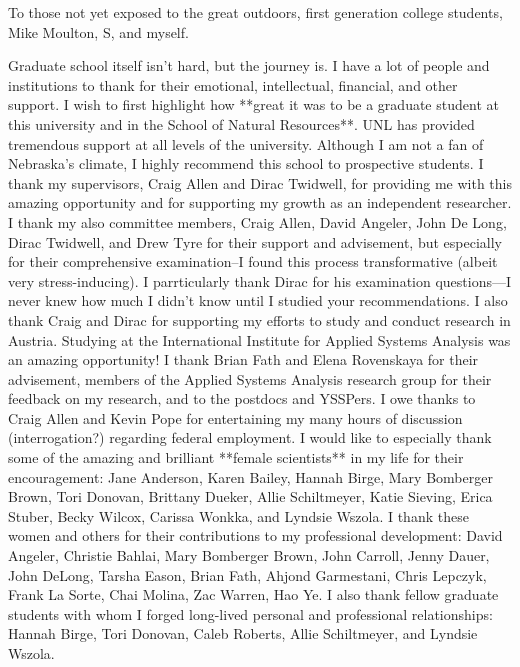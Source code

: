 \documentclass[print]{nuthesis}
\begin{document}

 \begin{dedication}
To those not yet exposed to the great outdoors, first generation college students, Mike Moulton, S, and myself.
 \end{dedication}

 \begin{acknowledgments}
Graduate school itself isn't hard, but the journey is. I have a lot of people and institutions to thank for their emotional, intellectual, financial, and other support. I wish to first highlight how **great it was to be a graduate student at this university and in the School of Natural Resources**. UNL has provided tremendous support at all levels of the university. Although I am not a fan of Nebraska's climate, I highly recommend this school to prospective students. 
I thank my supervisors, Craig Allen and Dirac Twidwell, for providing me with this amazing opportunity and for supporting my growth as an independent researcher. I thank my also committee members, Craig Allen, David Angeler, John De Long, Dirac Twidwell, and Drew Tyre for their support and advisement, but especially for their comprehensive examination--I found this process transformative (albeit very stress-inducing). I  parrticularly thank Dirac for his examination questions---I never knew how much I didn't know until I studied your recommendations. I also thank Craig and Dirac for supporting my efforts to study and conduct research in Austria. 
Studying at the International Institute for Applied Systems Analysis was an amazing opportunity! I thank Brian Fath and Elena Rovenskaya for their advisement, members of the Applied Systems Analysis research group for their feedback on my research, and to the postdocs and YSSPers. I owe thanks to Craig Allen and Kevin Pope for entertaining my many hours of discussion (interrogation?) regarding federal employment. 
I would like to especially thank some of the amazing and brilliant **female scientists** in my life for their encouragement: Jane Anderson, Karen Bailey, Hannah Birge, Mary Bomberger Brown, Tori Donovan, Brittany Dueker, Allie Schiltmeyer, Katie Sieving, Erica Stuber,  Becky Wilcox, Carissa Wonkka, and Lyndsie Wszola. I thank these women and others for their contributions to my professional development: David Angeler, Christie Bahlai, Mary Bomberger Brown, John Carroll, Jenny Dauer, John DeLong, Tarsha Eason, Brian Fath, Ahjond Garmestani, Chris Lepczyk, Frank La Sorte, Chai Molina, Zac Warren, Hao Ye. I also thank fellow graduate students with whom I forged long-lived personal and professional relationships: Hannah Birge, Tori Donovan, Caleb Roberts, Allie Schiltmeyer, and Lyndsie Wszola. 

\end{acknowledgments}
\end{document}
